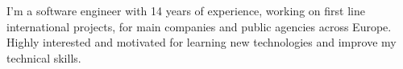\par{
I'm a software engineer with 14 years of experience, working on first line international projects, for main companies and public agencies across Europe. Highly interested and motivated for learning new technologies and improve my technical skills.

}